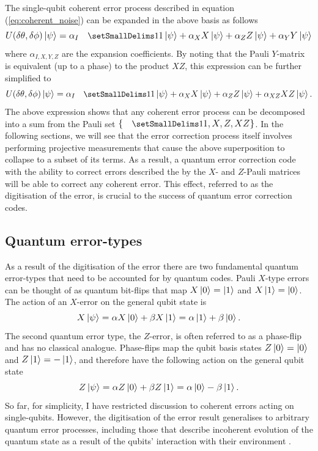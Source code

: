 \documentclass[]{arxiv}
\theoremstyle{plain}%
\theoremstyle{definition}
\theoremstyle{remark}
\DeclareRobustCommand\openone{\leavevmode\hbox{\small1\normalsize\kern-.33em1}}
\begin{document}
%
The single-qubit coherent error process described in equation (\ref{eq:coherent_noise}) can be expanded in the above basis as follows
%
\begin{equation}
U(\delta\theta,\delta\phi)\ket{\psi}=\alpha_{I}\openone \ket{\psi} + \alpha_{X} X \ket{\psi} + \alpha_ZZ \ket{\psi} + \alpha_Y Y \ket{\psi}
\end{equation}
%
where $\alpha_{I,X,Y,Z}$ are the expansion coefficients. By noting that the Pauli $Y$-matrix is equivalent (up to a phase) to the product $XZ$, this expression can be further simplified to
%
\begin{equation} \label{eq:dig_err}
U(\delta\theta,\delta\phi)\ket{\psi}=\alpha_{I}\openone \ket{\psi} + \alpha_{X} X \ket{\psi} + \alpha_ZZ \ket{\psi} + \alpha_{XZ} XZ \ket{\psi}\rm.
\end{equation}
%
The above expression shows that any coherent error process can be decomposed into a sum from the Pauli set $\{\openone, X, Z, XZ\}$. In the following sections, we will see that the error correction process itself involves performing projective measurements that cause the above superposition to collapse to a subset of its terms. As a result, a quantum error correction code with the ability to correct errors described the by the $X$- and $Z$-Pauli matrices will be able to correct any coherent error. This effect, referred to as the digitisation of the error, is crucial to the success of quantum error correction codes.

\subsection{Quantum error-types} \label{sec:errors}

As a result of the digitisation of the error there are two fundamental quantum error-types that need to be accounted for by quantum codes. Pauli $X$-type errors can be thought of as quantum bit-flips that map $X\ket{0}= \ket{1}$ and $X\ket{1}=\ket{0}$. The action of an $X$-error on the general qubit state is
%
\begin{equation}\label{eq:bit_flip_gen}
X\ket{\psi}=\alpha X\ket{0}+\beta X\ket{1}=\alpha\ket{1}+\beta\ket{0}\rm.
\end{equation}
%
The second quantum error type, the $Z$-error, is often referred to as a phase-flip and has no classical analogue. Phase-flips map the qubit basis states $Z\ket{0}=\ket{0}$ and $Z\ket{1}=-\ket{1}$, and therefore have the following action on the general qubit state
%
\begin{equation}\label{eq:phase_flip_gen}
Z\ket{\psi}=\alpha Z\ket{0}+\beta Z\ket{1}=\alpha\ket{0}-\beta\ket{1}\rm.
\end{equation}
%
So far, for simplicity, I have restricted discussion to coherent errors acting on single-qubits. However, the digitisation of the error result generalises to arbitrary quantum error processes, including those that describe incoherent evolution of the quantum state as a result of the qubits' interaction with their environment \cite{Knill97}.
\end{document}
